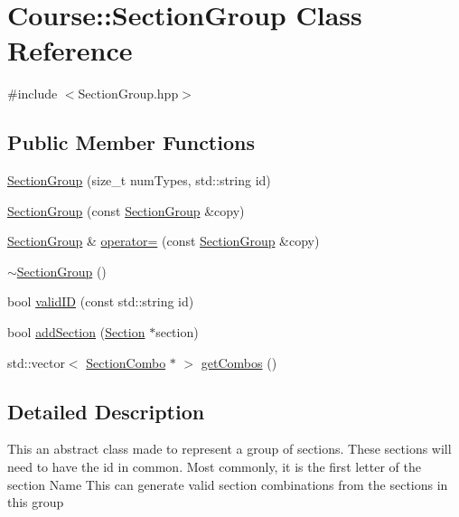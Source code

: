 \hypertarget{class_course_1_1_section_group}{}\section{Course\+:\+:Section\+Group Class Reference}
\label{class_course_1_1_section_group}


{\ttfamily \#include $<$Section\+Group.\+hpp$>$}

\subsection*{Public Member Functions}
\begin{DoxyCompactItemize}
\item 
\hyperlink{class_course_1_1_section_group_a868093a7b2828a2fded8a7e84a15fc66}{Section\+Group} (size\+\_\+t num\+Types, std\+::string id)
\item 
\hyperlink{class_course_1_1_section_group_a139584ccbcf7ece464e4aa1065aa77a8}{Section\+Group} (const \hyperlink{class_course_1_1_section_group}{Section\+Group} \&copy)
\item 
\hyperlink{class_course_1_1_section_group}{Section\+Group} \& \hyperlink{class_course_1_1_section_group_ae20b475f731b974cdb10bf779d5d61ae}{operator=} (const \hyperlink{class_course_1_1_section_group}{Section\+Group} \&copy)
\item 
\hyperlink{class_course_1_1_section_group_a141927166752b984046cde43d7be643e}{$\sim$\+Section\+Group} ()
\item 
bool \hyperlink{class_course_1_1_section_group_a02b17bb76a4b7e09314298f00dc841a1}{valid\+I\+D} (const std\+::string id)
\item 
bool \hyperlink{class_course_1_1_section_group_a2ac863f4dd03b61e0e7cd10bdfca53bb}{add\+Section} (\hyperlink{class_section}{Section} $\ast$section)
\item 
std\+::vector$<$ \hyperlink{class_section_combo}{Section\+Combo} $\ast$ $>$ \hyperlink{class_course_1_1_section_group_a1aa690e8794ee1d6fe819e8a1b4790a8}{get\+Combos} ()
\end{DoxyCompactItemize}


\subsection{Detailed Description}
This an abstract class made to represent a group of sections. These sections will need to have the id in common. Most commonly, it is the first letter of the section Name This can generate valid section combinations from the sections in this group 

